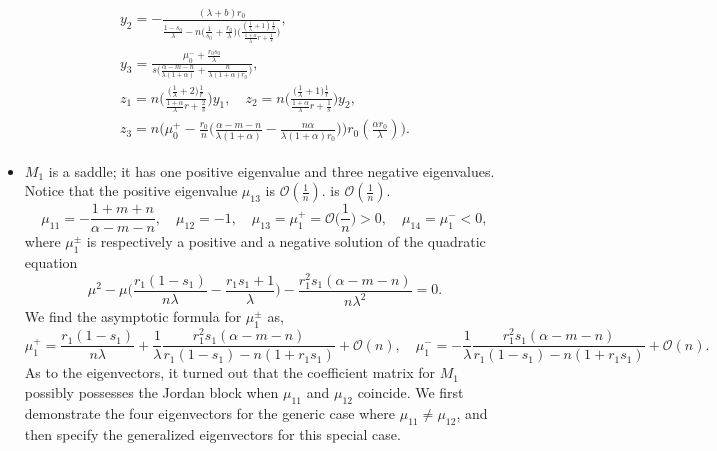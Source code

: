\documentclass[a4paper,11pt]{article}
\def\BO{{\mathcal{O}}}
\begin{document}
\begin{itemize}
\begin{align*}
\begin{array}{l}
 y_2=-\frac{(\lambda+b)r_0}{\frac{1-s_0}{\lambda} - n\Big(\frac{1}{s_0}+\frac{r_0}{\lambda}\Big)\Big(\frac{(\frac{1}{\lambda}+1)\frac{1}{s}}{ \frac{1+\alpha}{\lambda}r + \frac{1}{s} }\Big) },\\
 y_3=\frac{\mu_0^- +\frac{r_0s_0}{\lambda}}{s\Big(\frac{\alpha-m-n}{\lambda(1+\alpha)} + \frac{n}{\lambda(1+\alpha)r_0}\Big)},\\
 z_1=n\bigg(\frac{\big(\frac{1}{\lambda}+2\big)\frac{1}{r}}{ \frac{1+\alpha}{\lambda}r + \frac{2}{s} }\bigg)y_1, \quad
 z_2=n\bigg(\frac{\big(\frac{1}{\lambda}+1\big)\frac{1}{r}}{ \frac{1+\alpha}{\lambda}r + \frac{1}{s} }\bigg)y_2, \\
 z_3=n\bigg(\mu_0^+-\frac{r_0}{n}\Big(\frac{\alpha-m-n}{\lambda(1+\alpha)} - \frac{n\alpha}{\lambda(1+\alpha)r_0}\Big)\bigg)r_0(\frac{\alpha r_0}{\lambda})\bigg).
 \end{array}
\end{align*}
 \item $M_1$ is a saddle; it has one positive eigenvalue and three negative eigenvalues. Notice that the positive eigenvalue $\mu_{13}$ is $\mathcal{O}( \frac{1}{n})$. is $\mathcal{O}( \frac{1}{n})$.
\begin{equation}
 \mu_{11}=-\frac{1+m+n}{\alpha-m-n}, \quad \mu_{12}=-1, \quad \mu_{13}=\mu_1^+=\BO\Big(\frac{1}{n}\Big)>0, \quad \mu_{14}=\mu_1^{-}<0,
\end{equation}
where $\mu_1^\pm$ is respectively a positive and a negative solution of the quadratic equation
 $$ \mu^2 - \mu\Big(\frac{r_1(1-s_1)}{n\lambda}-\frac{r_1s_1+1}{\lambda}\Big) - \frac{r_1^2s_1(\alpha-m-n)}{n\lambda^2}=0.$$
We find the asymptotic formula for $\mu_1^\pm$ as,
$$\mu_1^+ = \frac{r_1(1-s_1)}{n\lambda} + \frac{1}{\lambda}\frac{{r_1^2s_1}(\alpha-m-n)}{ {r_1(1-s_1)}-n(1+r_1s_1) } + \BO(n), \quad \mu_1^- = -\frac{1}{\lambda}\frac{{r_1^2s_1}(\alpha-m-n)}{ {r_1(1-s_1)}-n(1+r_1s_1) } + \BO(n).$$ 
As to the eigenvectors, it turned out that the coefficient matrix for $M_1$ possibly possesses the Jordan block when $\mu_{11}$ and $\mu_{12}$ coincide. We first demonstrate the four eigenvectors for the generic case where $\mu_{11}\ne\mu_{12}$, and then specify the generalized eigenvectors for this special case.


\end{itemize}
\end{document}
